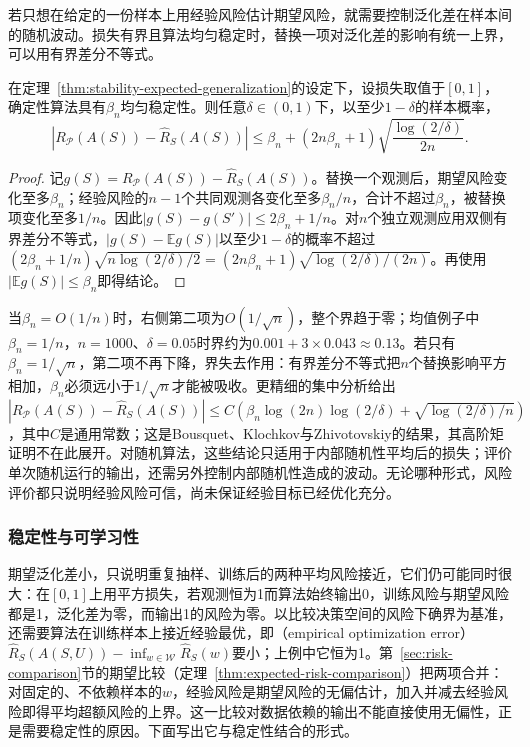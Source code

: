 若只想在给定的一份样本上用经验风险估计期望风险，就需要控制泛化差在样本间的随机波动。损失有界且算法均匀稳定时，替换一项对泛化差的影响有统一上界，可以用有界差分不等式。

\begin{theorem}[均匀稳定性的高概率泛化界]
\label{thm:stability-high-probability}
在定理~\ref{thm:stability-expected-generalization}的设定下，设损失取值于$[0,1]$，确定性算法具有$\beta_n$均匀稳定性。则任意$\delta\in(0,1)$下，以至少$1-\delta$的样本概率，
\[
 |R_{\mathcal P}(A(S))-\hat R_S(A(S))|
 \leq\beta_n+(2n\beta_n+1)\sqrt{\frac{\log(2/\delta)}{2n}}.
\]
\end{theorem}
\begin{proof}
记$g(S)=R_{\mathcal P}(A(S))-\hat R_S(A(S))$。替换一个观测后，期望风险变化至多$\beta_n$；经验风险的$n-1$个共同观测各变化至多$\beta_n/n$，合计不超过$\beta_n$，被替换项变化至多$1/n$。因此$|g(S)-g(S')|\leq2\beta_n+1/n$。对$n$个独立观测应用双侧有界差分不等式，$|g(S)-\mathbb Eg(S)|$以至少$1-\delta$的概率不超过$(2\beta_n+1/n)\sqrt{n\log(2/\delta)/2}=(2n\beta_n+1)\sqrt{\log(2/\delta)/(2n)}$。再使用$|\mathbb E g(S)|\leq\beta_n$即得结论。
\end{proof}

当$\beta_n=O(1/n)$时，右侧第二项为$O(1/\sqrt n)$，整个界趋于零；均值例子中$\beta_n=1/n$，$n=1000$、$\delta=0.05$时界约为$0.001+3\times0.043\approx0.13$。若只有$\beta_n=1/\sqrt n$，第二项不再下降，界失去作用：有界差分不等式把$n$个替换影响平方相加，$\beta_n$必须远小于$1/\sqrt n$才能被吸收。更精细的集中分析给出$|R_{\mathcal P}(A(S))-\hat R_S(A(S))|\leq C(\beta_n\log(2n)\log(2/\delta)+\sqrt{\log(2/\delta)/n})$，其中$C$是通用常数；这是Bousquet、Klochkov与Zhivotovskiy的结果，其高阶矩证明不在此展开。对随机算法，这些结论只适用于内部随机性平均后的损失；评价单次随机运行的输出，还需另外控制内部随机性造成的波动。无论哪种形式，风险评价都只说明经验风险可信，尚未保证经验目标已经优化充分。
\subsubsection{稳定性与可学习性}
\label{sec:stability-characterization}

期望泛化差小，只说明重复抽样、训练后的两种平均风险接近，它们仍可能同时很大：在$[0,1]$上用平方损失，若观测恒为1而算法始终输出0，训练风险与期望风险都是1，泛化差为零，而输出1的风险为零。以比较决策空间的风险下确界为基准，还需要算法在训练样本上接近经验最优，即（empirical optimization error）$\hat R_S(A(S,U))-\inf_{w\in\mathcal W}\hat R_S(w)$要小；上例中它恒为1。第~\ref{sec:risk-comparison}节的期望比较（定理~\ref{thm:expected-risk-comparison}）把两项合并：对固定的、不依赖样本的$w$，经验风险是期望风险的无偏估计，加入并减去经验风险即得平均超额风险的上界。这一比较对数据依赖的输出不能直接使用无偏性，正是需要稳定性的原因。下面写出它与稳定性结合的形式。

